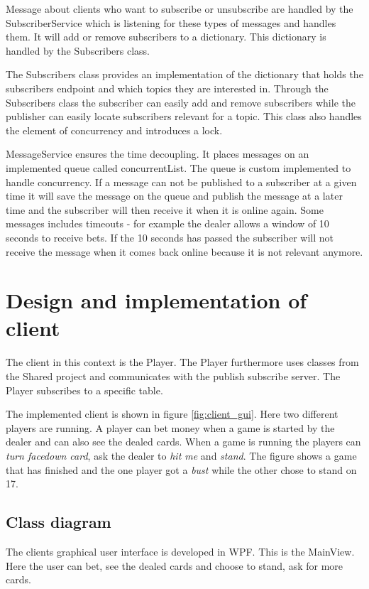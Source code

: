 Message about clients who want to subscribe or unsubscribe are handled by the SubscriberService which is listening for these types of messages and handles them. It will add  or remove subscribers to a dictionary. This dictionary is handled by the Subscribers class.

The Subscribers class provides an implementation of the dictionary that holds the subscribers endpoint and which topics they are interested in. Through the Subscribers class the subscriber can easily add and remove subscribers while the publisher can easily locate subscribers relevant for a topic. This class also handles the element of concurrency and introduces a lock.

MessageService ensures the time decoupling. It places messages on an implemented queue called concurrentList. The queue is custom implemented to handle concurrency. If a message can not be published to a subscriber at a given time it will save the message on the queue and publish the message at a later time and the subscriber will then receive it when it is online again. Some messages includes timeouts - for example the dealer allows a window of 10 seconds to receive bets. If the 10 seconds has passed the subscriber will not receive the message when it comes back online because it is not relevant anymore.
\FloatBarrier

\section{Design and implementation of client}
The client in this context is the Player. The Player furthermore uses classes from the Shared project and communicates with the publish subscribe server. The Player subscribes to a specific table.


The implemented client is shown in figure \ref{fig:client_gui}. Here two different players are running. A player can bet money when a game is started by the dealer and can also see the dealed cards. When a game is running the players can \emph{turn facedown card}, ask the dealer to \emph{hit me} and \emph{stand}. The figure shows a game that has finished and the one player got a \emph{bust} while the other chose to stand on 17.
\FloatBarrier


\subsection{Class diagram}
The clients graphical user interface is developed in WPF. This is the MainView. Here the user can bet, see the dealed cards and choose to stand, ask for more cards. 

